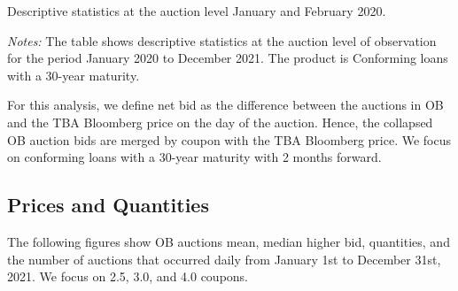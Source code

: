 \documentclass[11pt,a4paper]{article}
\begin{document}
\begin{table}[h]
  \centering
  
  \caption{Descriptive statistics at the auction level January and February 2020. }
  \begin{minipage}{\textwidth}
      \footnotesize{\textit{Notes:} The table shows descriptive statistics at the auction level of observation for the period January 2020 to December 2021.
     The product is Conforming loans with a 30-year maturity. } 
      \end{minipage}
\end{table}


For this analysis, we define net bid as the difference between the auctions in OB and the TBA Bloomberg price on the day of the auction. Hence, the collapsed OB auction bids are merged by coupon with the TBA Bloomberg price. We focus on conforming loans with a 30-year maturity with 2 months forward.


\subsection{Prices and Quantities}

The following figures show OB auctions mean, median higher bid, quantities, and the number of auctions that occurred daily from January 1st to December 31st,  2021. We focus on 2.5, 3.0, and 4.0 coupons. 

\end{document}
